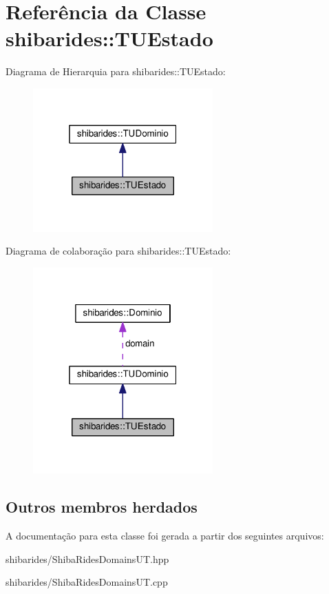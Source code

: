 \hypertarget{classshibarides_1_1TUEstado}{}\section{Referência da Classe shibarides\+:\+:T\+U\+Estado}
\label{classshibarides_1_1TUEstado}


Diagrama de Hierarquia para shibarides\+:\+:T\+U\+Estado\+:\nopagebreak
\begin{figure}[H]
\begin{center}
\leavevmode
\includegraphics[width=196pt]{classshibarides_1_1TUEstado__inherit__graph}
\end{center}
\end{figure}


Diagrama de colaboração para shibarides\+:\+:T\+U\+Estado\+:\nopagebreak
\begin{figure}[H]
\begin{center}
\leavevmode
\includegraphics[width=196pt]{classshibarides_1_1TUEstado__coll__graph}
\end{center}
\end{figure}
\subsection*{Outros membros herdados}


A documentação para esta classe foi gerada a partir dos seguintes arquivos\+:\begin{DoxyCompactItemize}
\item 
shibarides/Shiba\+Rides\+Domains\+U\+T.\+hpp\item 
shibarides/Shiba\+Rides\+Domains\+U\+T.\+cpp\end{DoxyCompactItemize}
